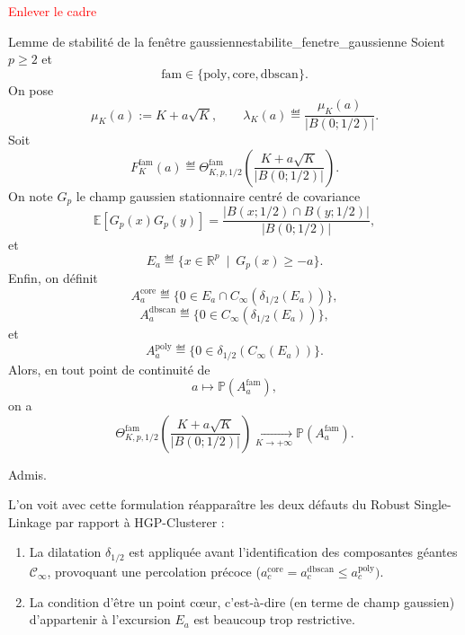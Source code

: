 \textcolor{red}{Enlever le cadre}

\begin{Fait}{Lemme de stabilité de la fenêtre gaussienne}{stabilite_fenetre_gaussienne}
Soient $p\geq 2$ et
\[
    \mathrm{fam}\in\{\mathrm{poly},\mathrm{core},\mathrm{dbscan}\}.
\]
On pose
\[
    \mu_K(a):=K+a\sqrt K,
    \qquad
    \lambda_K(a) \eqdef \frac{\mu_K(a)}{|B(0;1/2)|}.
\]
Soit
\[
    F_K^{\mathrm{fam}}(a)
    \eqdef
    \Theta^{\mathrm{fam}}_{K,p,1/2}
    \left(
        \frac{K+a\sqrt K}{|B(0;1/2)|}
    \right).
\]
On note $G_p$ le champ gaussien stationnaire centré de covariance
\[
    \mathbb E[G_p(x)G_p(y)]
    =
    \frac{|B(x;1/2)\cap B(y;1/2)|}{|B(0;1/2)|},
\]
et
\[
    E_a \eqdef \{x\in\mathbb R^p \ \mid \ G_p(x)\geq -a\}.
\]
Enfin, on définit
\[
    A_a^{\mathrm{core}}
    \eqdef
    \{0\in E_a\cap C_\infty(\delta_{1/2}(E_a))\},
\]
\[
    A_a^{\mathrm{dbscan}}
    \eqdef
    \{0\in C_\infty(\delta_{1/2}(E_a))\},
\]
et
\[
    A_a^{\mathrm{poly}}
    \eqdef
    \{0\in \delta_{1/2}(C_\infty(E_a))\}.
\]
Alors, en tout point de continuité de
\[
    a \mapsto \mathbb P(A_a^{\mathrm{fam}}),
\]
on a
\[
    \boxed{
    \Theta^{\mathrm{fam}}_{K,p,1/2}
    \left(
        \frac{K+a\sqrt K}{|B(0;1/2)|}
    \right)
    \xrightarrow[K\to+\infty]{}
    \mathbb P(A_a^{\mathrm{fam}}).
    }
\]
\end{Fait}

\begin{preuve}
    Admis.
\end{preuve}


L'on voit avec cette formulation réapparaître les deux défauts du Robust Single-Linkage par rapport à HGP-Clusterer : 
\begin{enumerate}
    \item La dilatation $\delta_{1/2}$ est appliquée avant l'identification des composantes géantes $\mathcal C_\infty$, provoquant une percolation précoce ($a_c^{\mathrm{core}} = a_c^{\mathrm{dbscan}} \le a_c^{\mathrm{poly}}).$
    \item La condition d'être un point c\oe ur, c'est-à-dire (en terme de champ gaussien) d'appartenir à l'excursion $E_a$ est beaucoup trop restrictive.
\end{enumerate}

